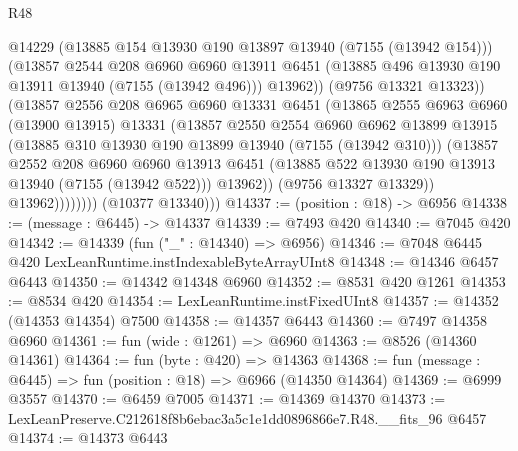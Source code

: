 \begin{lexlean}{R48}
\begin{coremodule}
                          @14229
                          (@13885 @154 @13930 @190 @13897 @13940 (@7155 (@13942 @154)))
                          (@13857
                            @2544
                            @208
                            @6960
                            @6960
                            @13911
                            @6451
                            (@13885 @496 @13930 @190 @13911 @13940 (@7155 (@13942 @496)))
                            @13962))
                        (@9756 @13321 @13323))
                      (@13857
                        @2556
                        @208
                        @6965
                        @6960
                        @13331
                        @6451
                        (@13865
                          @2555
                          @6963
                          @6960
                          (@13900 @13915)
                          @13331
                          (@13857
                            @2550
                            @2554
                            @6960
                            @6962
                            @13899
                            @13915
                            (@13885 @310 @13930 @190 @13899 @13940 (@7155 (@13942 @310)))
                            (@13857
                              @2552
                              @208
                              @6960
                              @6960
                              @13913
                              @6451
                              (@13885 @522 @13930 @190 @13913 @13940 (@7155 (@13942 @522)))
                              @13962))
                          (@9756 @13327 @13329))
                        @13962))))))))
        (@10377 @13340)))
@14337 := (position : @18) -> @6956
@14338 := (message : @6445) -> @14337
@14339 := @7493 @420
@14340 := @7045 @420
@14342 := @14339 (fun ("_" : @14340) => @6956)
@14346 := @7048 @6445 @420 LexLeanRuntime.instIndexableByteArrayUInt8
@14348 := @14346 @6457 @6443
@14350 := @14342 @14348 @6960
@14352 := @8531 @420 @1261
@14353 := @8534 @420
@14354 := LexLeanRuntime.instFixedUInt8
@14357 := @14352 (@14353 @14354) @7500
@14358 := @14357 @6443
@14360 := @7497 @14358 @6960
@14361 := fun (wide : @1261) => @6960
@14363 := @8526 (@14360 @14361)
@14364 := fun (byte : @420) => @14363
@14368 := fun (message : @6445) => fun (position : @18) => @6966 (@14350 @14364)
@14369 := @6999 @3557
@14370 := @6459 @7005
@14371 := @14369 @14370
@14373 := LexLeanPreserve.C212618f8b6ebac3a5c1e1dd0896866e7.R48.__fits_96 @6457
@14374 := @14373 @6443

\end{coremodule}
\end{lexlean}
